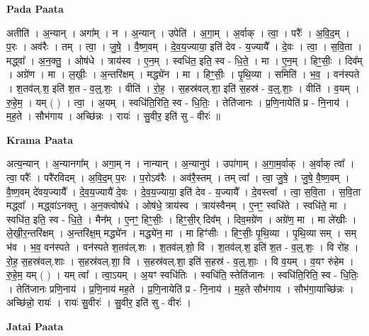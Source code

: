 \documentclass[17pt]{extarticle}
\begin{document}
\textbf{Pada Paata} \newline

अतीति॑ । अ॒न्यान् । अगा᳚म् । न । अ॒न्यान् । उपेति॑ । अ॒गा॒म् । अ॒र्वाक् । त्वा॒ । परैः᳚ । अ॒वि॒द॒म् । प॒रः । अव॑रैः । तम् । त्वा॒ । जु॒षे॒ । वै॒ष्ण॒वम् । दे॒व॒य॒ज्याया॒ इति॑ देव - य॒ज्यायै᳚ । दे॒वः । त्वा॒ । स॒वि॒ता । मद्ध्वा᳚ । अ॒न॒क्तु॒ । ओष॑धे । त्राय॑स्व । ए॒न॒म् । स्वधि॑त॒ इति॒ स्व - धि॒ते॒ । मा । ए॒न॒म् । हिꣳ॒॒सीः॒ । दिव᳚म् । अग्रे॑ण । मा । ल॒खीः॒ । अ॒न्तरि॑क्षम् । मद्ध्ये॑न । मा । हिꣳ॒॒सीः॒ । पृ॒थि॒व्या । समिति॑ । भ॒व॒ । वन॑स्पते । श॒तव॑ल्.श॒ इति॑ श॒त - व॒ल्॒.शः॒ । वीति॑ । रो॒ह॒ । स॒हस्र॑वल्.शा॒ इति॑ स॒हस्र॑ - व॒ल्॒.शाः॒ । वीति॑ । व॒यम् । रु॒हे॒म॒ । यम् ( ) । त्वा॒ । अ॒यम् । स्वधि॑ति॒रिति॒ स्व - धि॒तिः॒ । तेति॑जानः । प्र॒णि॒नायेति॑ प्र - नि॒नाय॑ । म॒ह॒ते । सौभ॑गाय । अच्छि॑न्नः । रायः॑ । सु॒वीर॒ इति॑ सु - वीरः॑ ॥  \newline


\textbf{Krama Paata} \newline

अत्य॒न्यान् । अ॒न्यानगा᳚म् । अगा॒म् न । नान्यान् । अ॒न्यानुप॑ । उपा॑गाम् । अ॒गा॒म॒र्वाक् । अ॒र्वाक् त्वा᳚ । त्वा॒ परैः᳚ । परै॑रविदम् । अ॒वि॒द॒म् प॒रः । प॒रोऽव॑रैः । अव॑रै॒स्तम् । तम् त्वा᳚ । त्वा॒ जु॒षे॒ । जु॒षे॒ वै॒ष्ण॒वम् । वै॒ष्ण॒वम् दे॑वय॒ज्यायै᳚ । दे॒व॒य॒ज्यायै॑ दे॒वः । दे॒व॒य॒ज्याया॒ इति॑ देव - य॒ज्यायै᳚ । दे॒वस्त्वा᳚ । त्वा॒ स॒वि॒ता । स॒वि॒ता मद्ध्वा᳚ । मद्ध्वा॑ऽनक्तु । अ॒न॒क्त्वोष॑धे । ओष॑धे॒ त्राय॑स्व । त्राय॑स्वैनम् । ए॒नꣳ॒॒ स्वधि॑ते । स्वधि॑ते॒ मा । स्वधि॑त॒ इति॒ स्व - धि॒ते॒ । मैन᳚म् । ए॒नꣳ॒॒ हिꣳ॒॒सीः॒ । हिꣳ॒॒सी॒र् दिव᳚म् । दिव॒मग्रे॑ण । अग्रे॑ण॒ मा । मा ले॑खीः । ले॒खी॒र॒न्तरि॑क्षम् । अ॒न्तरि॑क्ष॒म् मद्ध्ये॑न । मद्ध्ये॑न॒ मा । मा हिꣳ॑सीः । हिꣳ॒॒सीः॒ पृ॒थि॒व्या । पृ॒थि॒व्या सम् । सम् भ॑व । भ॒व॒ वन॑स्पते । वन॑स्पते श॒तव॑ल्.शः । श॒तव॑ल्.शो॒ वि । श॒तव॑ल्.श॒ इति॑ श॒त - व॒ल्॒.शः॒ । वि रो॑ह । रो॒ह॒ स॒हस्र॑वल्.शाः । स॒हस्र॑वल्.शा॒ वि । स॒हस्र॑वल्.शा॒ इति॑ स॒हस्र॑ - व॒ल्॒.शाः॒ । वि व॒यम् । व॒यꣳ रु॑हेम । रु॒हे॒म॒ यम् ( ) । यम् त्वा᳚ । त्वा॒ऽयम् । अ॒यꣳ स्वधि॑तिः । स्वधि॑ति॒ स्तेति॑जानः । स्वधि॑ति॒रिति॒ स्व - धि॒तिः॒ । तेति॑जानः प्रणि॒नाय॑ । प्र॒णि॒नाय॑ मह॒ते । प्र॒णि॒नायेति॑ प्र - नि॒नाय॑ । म॒ह॒ते सौभ॑गाय । सौभ॑गा॒याच्छि॑न्नः । अच्छि॑न्नो॒ रायः॑ । रायः॑ सु॒वीरः॑ । सु॒वीर॒ इति॑ सु - वीरः॑ । \newline

\textbf{Jatai Paata} \newline
\end{document}

